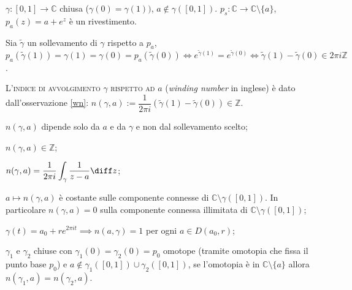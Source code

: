 \begin{oss} \label{wn}
  $\gamma:[0, 1] \longrightarrow \mathbb{C}$ chiusa ($\gamma(0)=\gamma(1))$, $a \not\in \gamma([0, 1])$. $p_s: \mathbb{C} \longrightarrow \mathbb{C} \setminus \{a\}$, $p_a(z)=a+e^z$ è un rivestimento.
  \begin{center}
  \end{center}
  Sia $\tilde{\gamma}$ un sollevamento di $\gamma$ rispetto a $p_a$, $p_a(\tilde{\gamma}(1))=\gamma(1)=\gamma(0)=p_a(\tilde{\gamma}(0)) \iff e^{\tilde{\gamma}(1)}=e^{\tilde{\gamma}(0)} \iff \tilde{\gamma}(1)-\tilde{\gamma}(0) \in 2\pi i \mathbb{Z}$.
\end{oss}

\begin{defn}
  L'\textsc{indice di avvolgimento $\gamma$ rispetto ad $a$} (\textit{winding number} in inglese) è dato dall'osservazione \ref{wn}: $n(\gamma, a):=\dfrac{1}{2\pi i}(\tilde{\gamma}(1)-\tilde{\gamma}(0)) \in \mathbb{Z}$.
\end{defn}

\begin{thm}
  \begin{nlist}
    \item $n(\gamma, a)$ dipende solo da $a$ e da $\gamma$ e non dal sollevamento scelto;
    \item $n(\gamma, a) \in \mathbb{Z}$;
    \item $\displaystyle n(\gamma, a)=\frac{1}{2\pi i}\int_{\gamma} \frac{1}{z-a} \diff z$;
    \item $a \longmapsto n(\gamma, a)$ è costante sulle componente connesse di $\mathbb{C} \setminus \gamma([0, 1])$. In particolare $n(\gamma, a)=0$ sulla componente connessa illimitata di $\mathbb{C} \setminus \gamma([0, 1])$;
    \item $\gamma(t)=a_0+re^{2\pi i t} \implies n(a, \gamma)=1$ per ogni $a \in D(a_0, r)$;
    \item $\gamma_1$ e $\gamma_2$ chiuse con $\gamma_1(0)=\gamma_2(0)=p_0$ omotope (tramite omotopia che fissa il punto base $p_0$) e $a \not\in \gamma_1([0, 1]) \cup \gamma_2([0, 1])$, se l'omotopia è in $\mathbb{C} \setminus \{a\}$ allora $n(\gamma_1, a)=n(\gamma_2, a)$.
  \end{nlist}
\end{thm}

